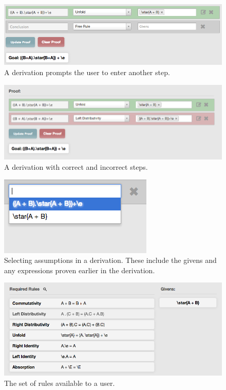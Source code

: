 \documentclass{sigchi}
\begin{document}
\begin{figure}[!h]
\centering
\includegraphics[width=1\columnwidth]{emptyline}
\caption{A derivation prompts the user to enter another step.}
\label{fig:emptyline}
\end{figure}


\begin{figure}[!h]
\centering
\includegraphics[width=1\columnwidth]{regexproof}
\caption{A derivation with correct and incorrect steps.}
\label{fig:regexproof}
\end{figure}

\begin{figure}[!h]
\centering
\includegraphics[width=0.7\columnwidth]{selectassumptions}
\caption{Selecting assumptions in a derivation. These include the givens and any expressions proven earlier in the derivation.}
\label{fig:selectassumptions}
\end{figure}

\begin{figure}[!h]
\centering
\includegraphics[width=1\columnwidth]{rules}
\caption{The set of rules available to a user.}
\label{fig:rules}
\end{figure}
\end{document}
